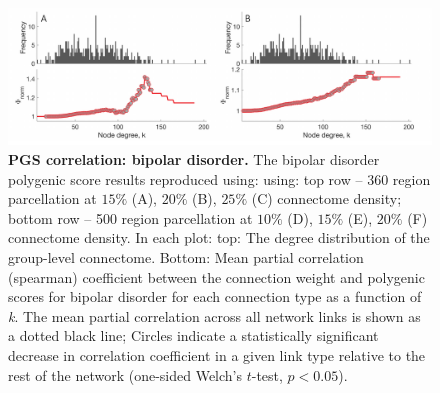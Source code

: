\begin{figure}[h!]
\begin{center}
\includegraphics[width=1\textwidth]{Chapter5/SFigure5.pdf}%
\end{center}
\caption{\textbf{PGS correlation: bipolar disorder.} 
The bipolar disorder polygenic score results reproduced using: using: top row -- 360 region parcellation at $15\%$ (A), $20\%$ (B), $25\%$ (C) connectome density; bottom row -- 500 region parcellation at $10\%$ (D), $15\%$ (E), $20\%$ (F) connectome density. In each plot: top: The degree distribution of the group-level connectome. Bottom: Mean partial correlation (spearman) coefficient between the connection weight and polygenic scores for bipolar disorder for each connection type as a function of \textit{k}. The mean partial correlation across all network links is shown as a dotted black line; Circles indicate a statistically significant decrease in correlation coefficient in a given link type relative to the rest of the network (one-sided Welch's $t$-test, $p < 0.05$).}
\label{fig:Ch5SFig5}
\end{figure}

